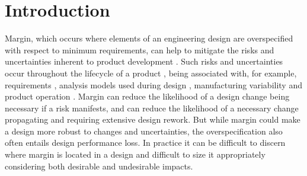\begin{abstract}

Margin occurs where a design is overspecified with respect to the minimum required. Margin may be desirable to mitigate risk and absorb future changes, but at the same time, may be undesirable if the overspecification deteriorates the design's performance. In this article, the Margin Value Method is introduced to analyse an engineering design, localise the excess margin, and quantify it considering change absorption potential in relation to design performance deterioration. The method provides guidance for improving a design by prioritising excess margin that provides relatively little advantage at high cost, and could therefore be eliminated to improve design performance. It shows how the value of excess margin depends on its localisation in the design parameter network, the importance of design performance parameters, and the importance of absorbing potential future changes. The method is applied to a belt conveyor design. This case indicates that the method is practicable, reveals implications, and suggests opportunities for further work.\\


\end{abstract}
\newpage


\section{Introduction}
\label{intro}

Margin, which occurs where elements of an engineering design are overspecified with respect to minimum requirements, can help to mitigate the risks and uncertainties inherent to product development \citep{Tackett2014}. Such risks and uncertainties occur throughout the lifecycle of a product \citep{Eckert2013}, being associated with, for example, requirements \citep{Watson2016}, analysis models used during design \citep{Guenov2018}, manufacturing variability \citep{Zhu2000,Morse2018} and product operation \citep{gimenez2002}.  Margin can reduce the likelihood of a design change being necessary if a risk manifests, and can reduce the likelihood of a necessary change propagating and requiring extensive design rework.  But while margin could make a design more robust to changes and uncertainties, the overspecification also often entails design performance loss. In practice it can be difficult to discern where margin is located in a design and difficult to size it appropriately considering both desirable and undesirable impacts.  

